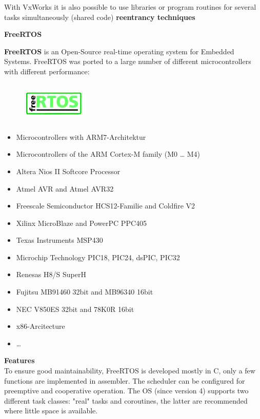 With VxWorks it is also possible to use libraries or program routines for several tasks simultaneously (shared code)  \textbf{reentrancy techniques}
\newpage

{\rot\bf FreeRTOS}

\textbf{FreeRTOS} is an Open-Source  real-time operating system for Embedded Systems. FreeRTOS was ported to a large number  of different microcontrollers with different performance:

 	\begin{figure}[h]
    \centering
    \includegraphics[width=3cm, height=2cm]{Images/image129.png}
    \label{fig:Fig }
    \end{figure}
    
\begin{itemize}
\item  Microcontrollers with ARM7-Architektur
\item  Microcontrollers of the ARM Cortex-M family (M0 {\dots} M4)
\item  Altera Nios II Softcore Processor
\item  Atmel AVR and Atmel AVR32
\item  Freescale Semiconductor HCS12-Familie and Coldfire V2
\item  Xilinx MicroBlaze and PowerPC PPC405
\item  Texas Instruments MSP430
\item  Microchip Technology PIC18, PIC24, dsPIC, PIC32
\item  Renesas H8/S SuperH
\item  Fujitsu MB91460 32bit and MB96340 16bit
\item  NEC V850ES 32bit and 78K0R 16bit
\item  x86-Arcitecture
\item  {\dots}
\end{itemize}

\textbf{Features}\\

To ensure good maintainability, FreeRTOS is developed mostly in C, only a few functions are implemented in assembler. The scheduler can be configured for preemptive and cooperative operation. The OS (since version 4) supports two different task classes: "real" tasks and coroutines, the latter are recommended where little space is available.\\

